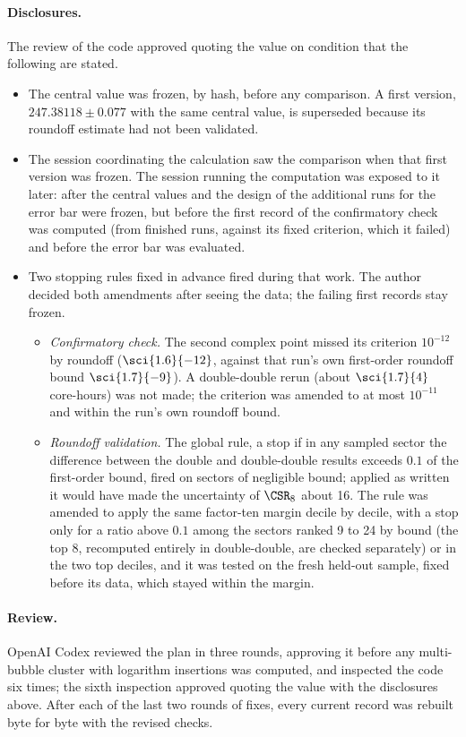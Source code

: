 \paragraph{Disclosures.} The review of the code approved quoting the value on condition that the following are stated.
\begin{itemize}
\item The central value was frozen, by hash, before any comparison. A first version, $247.38118\pm0.077$ with the same
 central value, is superseded because its roundoff estimate had not been validated.
\item The session coordinating the calculation saw the comparison when that first version was frozen. The session
 running the computation was exposed to it later: after the central values and the design of the additional runs for
 the error bar were frozen, but before the first record of the confirmatory check was computed (from finished runs,
 against its fixed criterion, which it failed) and before the error bar was evaluated.
\item Two stopping rules fixed in advance fired during that work. The author decided both amendments after seeing the
 data; the failing first records stay frozen.
 \begin{itemize}
 \item[A.] \emph{Confirmatory check.} The second complex point missed its criterion $10^{-12}$ by roundoff
  ($\sci{1.6}{-12}$, against that run's own first-order roundoff bound $\sci{1.7}{-9}$). A double-double rerun (about
  $\sci{1.7}{4}$ core-hours) was not made; the criterion was amended to at most $10^{-11}$ and within the run's own
  roundoff bound.
 \item[B.] \emph{Roundoff validation.} The global rule, a stop if in any sampled sector the difference between the
  double and double-double results exceeds $0.1$ of the first-order bound, fired on sectors of negligible bound; applied as written it would
  have made the uncertainty of $\CSR_8$ about 16. The rule was amended to apply the same factor-ten margin decile by
  decile, with a stop only for a ratio above $0.1$ among the sectors ranked 9 to 24 by bound (the top 8, recomputed entirely in
  double-double, are checked separately) or in the two top deciles, and it
  was tested on the fresh held-out sample, fixed before its data, which stayed within the margin.
 \end{itemize}
\end{itemize}

\paragraph{Review.} OpenAI Codex reviewed the plan in three rounds, approving it before any multi-bubble cluster with logarithm insertions
was computed, and
inspected the code six times; the sixth inspection approved quoting the value with the disclosures above. After each
of the last two rounds of fixes, every current record was rebuilt byte for byte with the revised checks.

